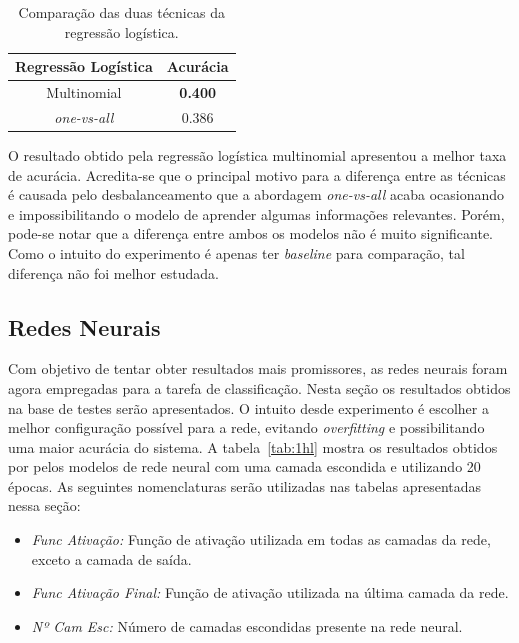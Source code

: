 \documentclass[conference]{IEEEtran}
\begin{document}
\begin{table}[h!]
	\centering
	
	\begin{tabular}{cc} \toprule
		\textbf{Regressão Logística} & \textbf{Acurácia} \\ \toprule 	
		Multinomial		          & \textbf{0.400}    \\
		\emph{one-vs-all}         & 0.386             \\ \bottomrule
	\end{tabular}
	\caption{Comparação das duas técnicas da regressão logística.}
\end{table}

O resultado obtido pela regressão logística multinomial apresentou a melhor taxa de acurácia. Acredita-se que o principal motivo para a diferença entre as técnicas é causada pelo desbalanceamento que a abordagem \emph{one-vs-all} acaba ocasionando e impossibilitando o modelo de aprender algumas informações relevantes. Porém, pode-se notar que a diferença entre ambos os modelos não é muito significante. Como o intuito do experimento é apenas ter \emph{baseline} para comparação, tal diferença não foi melhor estudada.


\subsection{Redes Neurais}

Com objetivo de tentar obter resultados mais promissores, as redes neurais foram agora empregadas para a tarefa de classificação. Nesta seção os resultados obtidos na base de testes serão apresentados. O intuito desde experimento é escolher a melhor configuração possível para a rede, evitando \emph{overfitting} e possibilitando uma maior acurácia do sistema. A tabela~\ref{tab:1hl} mostra os resultados obtidos por pelos modelos de rede neural com uma camada escondida e utilizando 20 épocas. As seguintes nomenclaturas serão utilizadas nas tabelas apresentadas nessa seção:

\begin{itemize}
	\item \emph{Func Ativação:} Função de ativação utilizada em todas as camadas da rede, exceto a camada de saída.
	
	\item \emph{Func Ativação Final:} Função de ativação utilizada na última camada da rede.
	
	\item \emph{Nº Cam Esc:} Número de camadas escondidas presente na rede neural.
\end{itemize}
\end{document}
